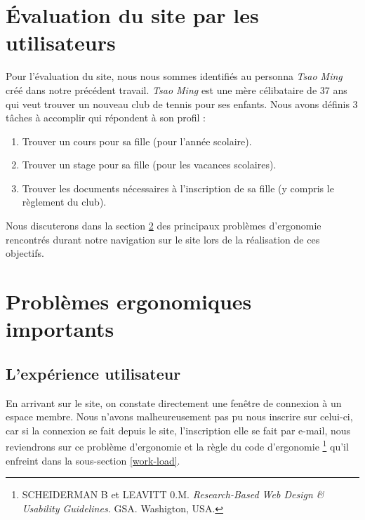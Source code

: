 \documentclass{article}[12pt]
\begin{document}
\section{Évaluation du site par les utilisateurs}
\begin{figure}[H]
	\centering   {}
\end{figure}
Pour l'évaluation du site, nous nous sommes identifiés au personna \textit{Tsao Ming} créé dans notre précédent travail. \textit{Tsao Ming} est une mère célibataire de 37 ans qui veut trouver un nouveau club de tennis pour ses enfants. Nous avons définis 3 tâches à accomplir qui répondent à son profil :
\begin{enumerate}
	\item Trouver un cours pour sa fille (pour l'année scolaire).
	\item Trouver un stage pour sa fille (pour les vacances scolaires).
	\item Trouver les documents nécessaires à l'inscription de sa fille (y compris le règlement du club).
\end{enumerate}
Nous discuterons dans la section \ref{prob_important} des principaux problèmes d'ergonomie rencontrés durant notre navigation sur le site lors de la réalisation de ces objectifs.
\newpage
\section{Problèmes ergonomiques importants}
\label{prob_important}
\subsection{L'expérience utilisateur}
En arrivant sur le site, on constate directement une fenêtre de connexion à un espace membre. Nous n'avons malheureusement pas pu nous inscrire sur celui-ci, car si la connexion se fait depuis le site, l'inscription elle se fait par e-mail, nous reviendrons sur ce problème d'ergonomie et la règle du code d'ergonomie  \footnote{SCHEIDERMAN B et LEAVITT 0.M. \textit{Research-Based Web Design \& Usability Guidelines.} GSA.  Washigton, USA.} qu'il enfreint dans la sous-section \ref{work-load}. 
\end{document}
